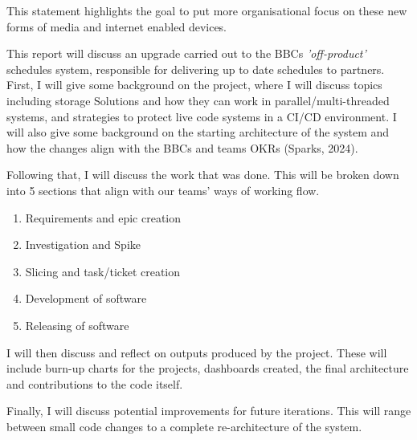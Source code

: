   This statement highlights the goal to put more organisational focus on these new forms of media and internet enabled devices. 
  
  This report will discuss an upgrade carried out to the BBCs \textit{'off-product'} schedules system, responsible for delivering up to date schedules to
  partners. First, I will give some background on the project, where I will discuss topics including storage Solutions
  and how they can work in parallel/multi-threaded systems, and strategies to protect live code systems in a CI/CD environment. I will also give some 
  background on the starting architecture of the system and how the changes align with the BBCs and teams OKRs (Sparks, 2024).
  
  Following that, I will discuss the work that was done. This will be broken down into 5 sections that align with our teams' ways of working flow.
  \begin{enumerate}
    \item Requirements and epic creation
    \item Investigation and Spike
    \item Slicing and task/ticket creation
    \item Development of software
    \item Releasing of software
  \end{enumerate}

  I will then discuss and reflect on outputs produced by the project. These will include burn-up charts for the projects, dashboards created, the 
  final architecture and contributions to the code itself.

  Finally, I will discuss potential improvements for future iterations. This will range between small code changes to a complete re-architecture of the system.
\newpage
